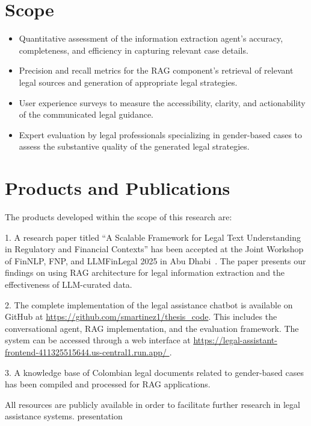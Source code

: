 \section{Scope}
\begin{itemize}
    \item Quantitative assessment of the information extraction agent's accuracy, completeness, and efficiency in capturing relevant case details.
    \item Precision and recall metrics for the RAG component's retrieval of relevant legal sources and generation of appropriate legal strategies.
    \item User experience surveys to measure the accessibility, clarity, and actionability of the communicated legal guidance.
    \item Expert evaluation by legal professionals specializing in gender-based cases to assess the substantive quality of the generated legal strategies.
\end{itemize}

\section{Products and Publications}
The products developed within the scope of this research are:

1. A research paper titled ``A Scalable Framework for Legal Text Understanding in Regulatory and Financial Contexts'' has been accepted at the Joint Workshop of FinNLP, FNP, and LLMFinLegal 2025 in Abu Dhabi~\cite{martinez-etal-2025-scalable}. 
The paper presents our findings on using RAG architecture for legal information extraction and the effectiveness of LLM-curated data.

2. The complete implementation of the legal assistance chatbot is available on GitHub at 
\url{https://github.com/smartinez1/thesis_code}. This includes the conversational agent, RAG implementation, 
and the evaluation framework. The system can be accessed through a web interface at \url{https://legal-assistant-frontend-411325515644.us-central1.run.app/ }.

3. A knowledge base of Colombian legal documents related to gender-based cases has been compiled and processed for RAG applications.

All resources are publicly available in order to facilitate further research in legal assistance systems.
presentation
\endinput